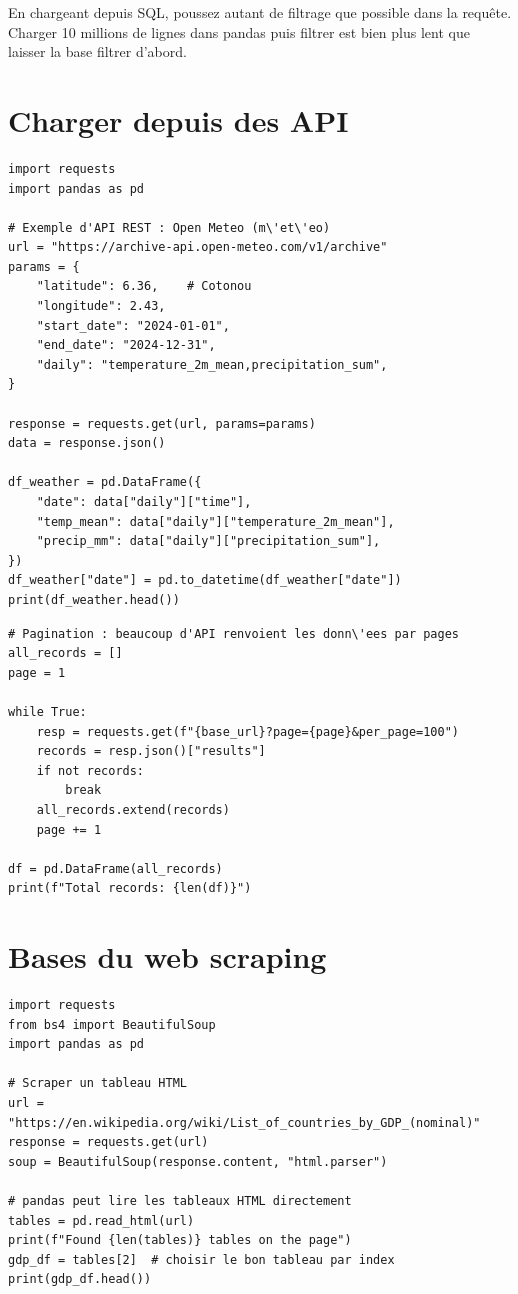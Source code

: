 \begin{preprocesstip}
En chargeant depuis SQL, poussez autant de filtrage que possible dans la requ\^ete. Charger 10 millions de lignes dans pandas puis filtrer est bien plus lent que laisser la base filtrer d'abord.
\end{preprocesstip}

\section{Charger depuis des API}

\begin{verbatim}
import requests
import pandas as pd

# Exemple d'API REST : Open Meteo (m\'et\'eo)
url = "https://archive-api.open-meteo.com/v1/archive"
params = {
    "latitude": 6.36,    # Cotonou
    "longitude": 2.43,
    "start_date": "2024-01-01",
    "end_date": "2024-12-31",
    "daily": "temperature_2m_mean,precipitation_sum",
}

response = requests.get(url, params=params)
data = response.json()

df_weather = pd.DataFrame({
    "date": data["daily"]["time"],
    "temp_mean": data["daily"]["temperature_2m_mean"],
    "precip_mm": data["daily"]["precipitation_sum"],
})
df_weather["date"] = pd.to_datetime(df_weather["date"])
print(df_weather.head())
\end{verbatim}

\begin{verbatim}
# Pagination : beaucoup d'API renvoient les donn\'ees par pages
all_records = []
page = 1

while True:
    resp = requests.get(f"{base_url}?page={page}&per_page=100")
    records = resp.json()["results"]
    if not records:
        break
    all_records.extend(records)
    page += 1

df = pd.DataFrame(all_records)
print(f"Total records: {len(df)}")
\end{verbatim}

\section{Bases du web scraping}

\begin{verbatim}
import requests
from bs4 import BeautifulSoup
import pandas as pd

# Scraper un tableau HTML
url = "https://en.wikipedia.org/wiki/List_of_countries_by_GDP_(nominal)"
response = requests.get(url)
soup = BeautifulSoup(response.content, "html.parser")

# pandas peut lire les tableaux HTML directement
tables = pd.read_html(url)
print(f"Found {len(tables)} tables on the page")
gdp_df = tables[2]  # choisir le bon tableau par index
print(gdp_df.head())
\end{verbatim}

